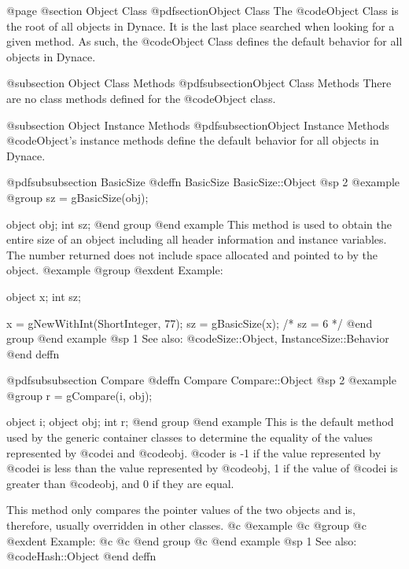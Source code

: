 @page
@section Object Class
@pdfsection{Object Class}
The @code{Object} Class is the root of all objects in Dynace.  It is the
last place searched when looking for a given method.  As such, the
@code{Object} Class defines the default behavior for all objects in Dynace.

@subsection Object Class Methods
@pdfsubsection{Object Class Methods}
There are no class methods defined for the @code{Object} class.

@subsection Object Instance Methods
@pdfsubsection{Object Instance Methods}
@code{Object}'s instance methods define the default behavior for all objects
in Dynace.











@pdfsubsubsection {BasicSize}
@deffn {BasicSize} BasicSize::Object
@sp 2
@example
@group
sz = gBasicSize(obj);

object  obj;
int     sz;
@end group
@end example
This method is used to obtain the entire size of an object including
all header information and instance variables.  The number returned
does not include space allocated and pointed to by the object.
@example
@group
@exdent Example:

object  x;
int     sz;

x = gNewWithInt(ShortInteger, 77);
sz = gBasicSize(x);    /*  sz = 6  */
@end group
@end example
@sp 1
See also:  @code{Size::Object, InstanceSize::Behavior}
@end deffn
















@pdfsubsubsection {Compare}
@deffn {Compare} Compare::Object
@sp 2
@example
@group
r = gCompare(i, obj);

object  i;
object  obj;
int     r;
@end group
@end example
This is the default method used by the generic container classes to
determine the equality of the values represented by @code{i} and
@code{obj}.  @code{r} is -1 if the value represented by @code{i} is less
than the value represented by @code{obj}, 1 if the value of @code{i} is
greater than @code{obj}, and 0 if they are equal.

This method only compares the pointer values of the two objects and is,
therefore, usually overridden in other classes.
@c @example
@c @group
@c @exdent Example:
@c
@c @end group
@c @end example
@sp 1
See also:  @code{Hash::Object}
@end deffn












